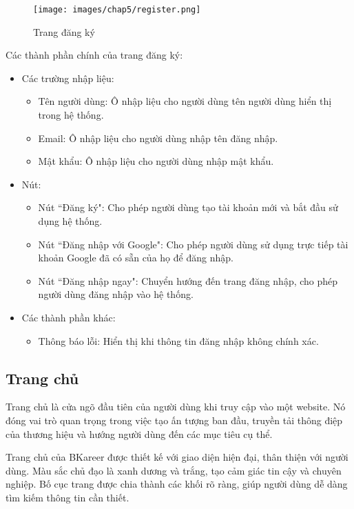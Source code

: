 \begin{figure}[H]
    \centering
    \texttt{[image: images/chap5/register.png]}
    \vspace{0.5cm}
    \caption{Trang đăng ký}
\end{figure}

Các thành phần chính của trang đăng ký:
\begin{itemize}
    \item Các trường nhập liệu:
        \begin{itemize}
            \item Tên người dùng: Ô nhập liệu cho người dùng tên người dùng hiển thị trong hệ thống.
            \item Email: Ô nhập liệu cho người dùng nhập tên đăng nhập.
            \item Mật khẩu: Ô nhập liệu cho người dùng nhập mật khẩu.
        \end{itemize}
    \item Nút:
        \begin{itemize}
            \item Nút ``Đăng ký": Cho phép người dùng tạo tài khoản mới và bắt đầu sử dụng hệ thống.
            \item Nút ``Đăng nhập với Google": Cho phép người dùng sử dụng trực tiếp tài khoản Google đã có sẵn của họ để đăng nhập.
            \item Nút ``Đăng nhập ngay": Chuyển hướng đến trang đăng nhập, cho phép người dùng đăng nhập vào hệ thống.
        \end{itemize}
    \item Các thành phần khác:
        \begin{itemize}
            \item Thông báo lỗi: Hiển thị khi thông tin đăng nhập không chính xác.
        \end{itemize}
\end{itemize}


\subsection{Trang chủ}
Trang chủ là cửa ngõ đầu tiên của người dùng khi truy cập vào một website. Nó đóng vai trò quan trọng trong việc tạo ấn tượng ban đầu, truyền tải thông điệp của thương hiệu và hướng người dùng đến các mục tiêu cụ thể.

Trang chủ của BKareer được thiết kế với giao diện hiện đại, thân thiện với người dùng. Màu sắc chủ đạo là xanh dương và trắng, tạo cảm giác tin cậy và chuyên nghiệp. Bố cục trang được chia thành các khối rõ ràng, giúp người dùng dễ dàng tìm kiếm thông tin cần thiết.


